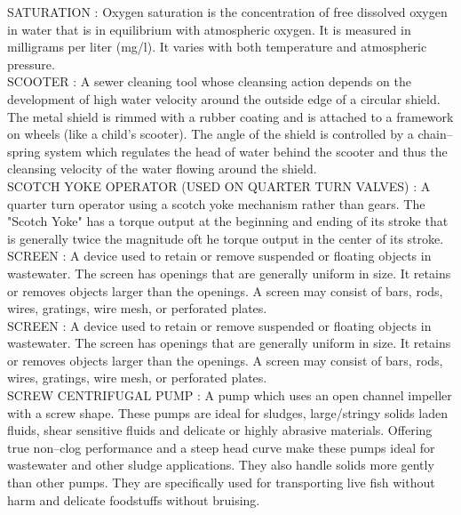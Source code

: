 \vspace{0.15cm}
SATURATION :  Oxygen saturation is the concentration of free dissolved oxygen in water that is in equilibrium with atmospheric oxygen. It is measured in milligrams per liter (mg/l). It varies with both temperature and atmospheric pressure.\\
\vspace{0.15cm}
SCOOTER :  A sewer cleaning tool whose cleansing action depends on the development of high water velocity around the outside edge of a circular shield. The metal shield is rimmed with a rubber coating and is attached to a framework on wheels (like a child’s scooter). The angle of the shield is controlled by a chain–spring system which regulates the head of water behind the scooter and thus the cleansing velocity of the water flowing around the shield. \\
\vspace{0.15cm}
SCOTCH YOKE OPERATOR (USED ON QUARTER TURN VALVES) :   A quarter turn operator using a scotch yoke mechanism rather than gears. The "Scotch Yoke" has a torque output at the beginning and ending of its stroke that is generally twice the magnitude oft he torque output in the center of its stroke.\\
\vspace{0.15cm}
SCREEN :  A device used to retain or remove suspended or floating objects in wastewater. The screen has openings that are generally uniform in size. It retains or removes objects larger than the openings. A screen may consist of bars, rods, wires, gratings, wire mesh, or perforated plates.\\
\vspace{0.15cm}
SCREEN :  A device used to retain or remove suspended or floating objects in wastewater. The screen has openings that are generally uniform in size. It retains or removes objects larger than the openings. A screen may consist of bars, rods, wires, gratings, wire mesh, or perforated plates.\\
\vspace{0.15cm}
SCREW CENTRIFUGAL PUMP :   A pump which uses an open channel impeller with a screw shape. These pumps are ideal for sludges, large/stringy solids laden fluids, shear sensitive fluids and delicate or highly abrasive materials. Offering true non–clog performance and a steep head curve make these pumps ideal for wastewater and other sludge applications. They also handle solids more gently than other pumps. They are specifically used for transporting live fish without harm and delicate foodstuffs without bruising.\\
